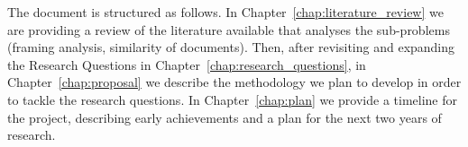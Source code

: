







The document is structured as follows.
In Chapter~\ref{chap:literature_review} we are providing a review of the literature available that analyses the sub-problems (framing analysis, similarity of documents).
Then, after revisiting and expanding the Research Questions in Chapter~\ref{chap:research_questions}, in Chapter~\ref{chap:proposal} we describe the methodology we plan to develop in order to tackle the research questions.%
In Chapter~\ref{chap:plan} we provide a timeline for the project, describing early achievements and a plan for the next two years of research.


